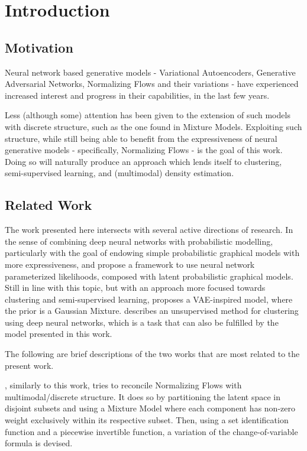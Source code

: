 \chapter{Introduction}
\label{chapter:introduction}

\section{Motivation}
\label{section:motivation}

Neural network based generative models - Variational Autoencoders, Generative
Adversarial Networks, Normalizing Flows and their variations - have experienced
increased interest and progress in their capabilities, in the last few years.

Less (although some) attention has been given to the extension of such
models with discrete structure, such as the one found in Mixture Models. Exploiting
such structure, while still being able to benefit from the expressiveness of
neural generative models - specifically, Normalizing Flows - is the goal of this
work. Doing so will naturally produce an approach which lends itself to
clustering, semi-supervised learning, and (multimodal) density estimation.

\section{Related Work}
\label{section:related}

The work presented here intersects with several active directions of research.
In the sense of combining deep neural networks with probabilistic modelling,
particularly with the goal of endowing simple probabilistic graphical models
with more expressiveness, \cite{svae} and \cite{lin2018variational} propose a
framework to use neural network parameterized likelihoods, composed with latent
probabilistic graphical models. Still in line with this topic, but with an
approach more focused towards clustering and semi-supervised learning, \cite{gmVAE}
proposes a VAE-inspired model, where the prior is a Gaussian Mixture. \cite{DEC}
describes an unsupervised method for clustering using deep neural networks, which
is a task that can also be fulfilled by the model presented in this work.

The following are brief descriptions of the two works that are most related to
the present work.

\cite{RAD}, similarly to this work, tries to reconcile Normalizing Flows with
multimodal/discrete structure. It does so by partitioning the latent space in
disjoint subsets and using a Mixture Model where each component has non-zero
weight exclusively within its respective subset. Then, using a set identification
function and a piecewise invertible function, a variation of the change-of-variable
formula is devised.

